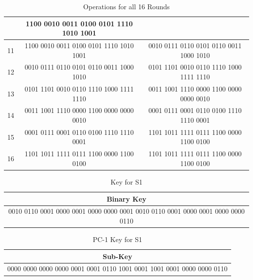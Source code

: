 \documentclass[12pt, letterpaper]{article}
\begin{document}
\begin{table}[ht]
\begin{tabular}{|c|c|c|}
 & 1100 0010 0011 0100 0101 1110 1010 1001

  \\
         \hline
    11 & 1100 0010 0011 0100 0101 1110 1010 1001

 & 0010 0111 0110 0101 0110 0011 1000 1010

  \\
         \hline
    12 & 0010 0111 0110 0101 0110 0011 1000 1010

 & 0101 1101 0010 0110 1110 1000 1111 1110

  \\
         \hline
    13 & 0101 1101 0010 0110 1110 1000 1111 1110

 & 0011 1001 1110 0000 1100 0000 0000 0010  \\
         \hline
    14 & 0011 1001 1110 0000 1100 0000 0000 0010 & 0001 0111 0001 0110 0100 1110 1110 0001

  \\
         \hline
    15 & 0001 0111 0001 0110 0100 1110 1110 0001

 & 1101 1011 1111 0111 1100 0000 1100 0100

  \\
         \hline
    16 & 1101 1011 1111 0111 1100 0000 1100 0100

 & 1101 1011 1111 0111 1100 0000 1100 0100

  \\
    \hline
  \end{tabular}
    \caption{Operations for all 16 Rounds}

    

\end{table}

\begin{table}[h]
    \centering
    \begin{tabular}{|c|}
        \hline
          Binary Key \\
        \hline
        0010 0110 0001 0000 0001 0000 0000 0001 0010 0110 0001 0000 0001 0000 0000 0110  \\
        \hline
    \end{tabular}
    \caption{Key for S1}
    \label{tab:text-key}
\end{table}

\begin{table}[h]
    \centering
    \begin{tabular}{|c|}
        \hline
          Sub-Key\\
        \hline
        0000 0000 0000 0000 0001 0001 0110 1001 0001 1001 0001 0000 0000 0110 \\
        \hline
    \end{tabular}
    \caption{PC-1 Key for S1}
    \label{tab:text-key}
\end{table}
\end{document}
